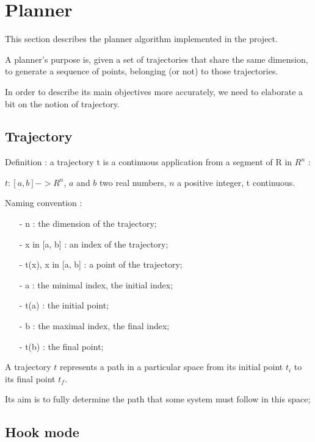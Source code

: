 
\newpage

\section{Planner}

This section describes the planner algorithm implemented in the project.
\newline

A planner's purpose is, given a set of trajectories that share the same dimension, to generate a sequence of 
points, belonging (or not) to those trajectories.
\newline

In order to describe its main objectives more accurately, we need to elaborate a bit on the notion of 
trajectory.
\newline

\subsection{Trajectory}

Definition : a trajectory t is a continuous application from a segment of R in $R^n$ :
\newline

$t : [a, b] -> R^n$, $a$ and $b$ two real numbers, $n$ a positive integer, t continuous.
\newline

Naming convention : 
\begin{itemize}
\item [-] n : the dimension of the trajectory;
\item [-] x in [a, b] : an index of the trajectory;
\item [-] t(x), x in [a, b] : a point of the trajectory;
\item [-] a : the minimal index, the initial index;
\item [-] t(a) : the initial point;
\item [-] b : the maximal index, the final index;
\item [-] t(b) : the final point;
\newline
\end{itemize}

A trajectory $t$ represents a path in a particular space from its initial point $t_i$ to its final point 
$t_f$.

Its aim is to fully determine the path that some system must follow in this space;


\subsection{Hook mode}

